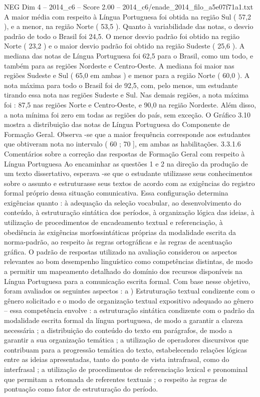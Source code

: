 \begin{textsample}{NEG Dim 4 – 2014\_c6 – Score 2.00 – 2014\_c6/enade\_2014\_filo\_a5e07f71a1.txt}
A maior média com respeito à Língua Portuguesa foi obtida na região Sul ( 57,2 ), e a menor, na região Norte ( 53,5 ).
Quanto à variabilidade das notas, o desvio padrão de todo o Brasil foi 24,5.
O menor desvio padrão foi obtido na região Norte ( 23,2 ) e o maior desvio padrão foi obtido na região Sudeste ( 25,6 ).
A mediana das notas de Língua Portuguesa foi 62,5 para o Brasil, como um todo, e também para as regiões Nordeste e Centro-Oeste.
A mediana foi maior nas regiões Sudeste e Sul ( 65,0 em ambas ) e menor para a região Norte ( 60,0 ).
A nota máxima para todo o Brasil foi de 92,5, com, pelo menos, um estudante tirando essa nota nas regiões Sudeste e Sul.
Nas demais regiões, a nota máxima foi : 87,5 nas regiões Norte e Centro-Oeste, e 90,0 na região Nordeste.
Além disso, a nota mínima foi zero em todas as regiões do país, sem exceção.
O Gráfico 3.10 mostra a distribuição das notas de Língua Portuguesa do Componente de Formação Geral.
Observa -se que a maior frequência corresponde aos estudantes que obtiveram nota no intervalo ( 60 ; 70 ], em ambas as habilitações. 3.3.1.6 Comentários sobre a correção das respostas de Formação Geral com respeito à Língua Portuguesa Ao encaminhar as questões 1 e 2 na direção da produção de um texto dissertativo, esperava -se que o estudante utilizasse seus conhecimentos sobre o assunto e estruturasse seus textos de acordo com as exigências do registro formal próprio dessa situação comunicativa.
Essa configuração determina exigências quanto : à adequação da seleção vocabular, ao desenvolvimento do conteúdo, à estruturação sintática dos períodos, à organização lógica das ideias, à utilização de procedimentos de encadeamento textual e referenciação, à obediência às exigências morfossintáticas próprias da modalidade escrita da norma-padrão, ao respeito às regras ortográficas e às regras de acentuação gráfica.
O padrão de respostas utilizado na avaliação considerou os aspectos relevantes ao bom desempenho linguístico como competências distintas, de modo a permitir um mapeamento detalhado do domínio dos recursos disponíveis na Língua Portuguesa para a comunicação escrita formal.
Com base nesse objetivo, foram avaliados os seguintes aspectos : a ) Estruturação textual condizente com o gênero solicitado e o modo de organização textual expositivo adequado ao gênero – essa competência envolve : a estruturação sintática condizente com o padrão da modalidade escrita formal da língua portuguesa, de modo a garantir a clareza necessária ; a distribuição do conteúdo do texto em parágrafos, de modo a garantir a sua organização temática ; a utilização de operadores discursivos que contribuam para a progressão temática do texto, estabelecendo relações lógicas entre as ideias apresentadas, tanto do ponto de vista intrafrasal, como do interfrasal ; a utilização de procedimentos de referenciação lexical e pronominal que permitam a retomada de referentes textuais ; o respeito às regras de pontuação como fator de estruturação do período.

\end{textsample}
